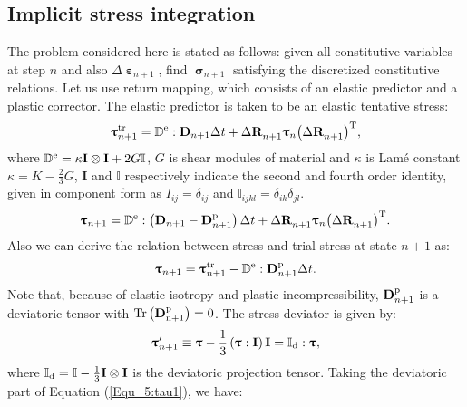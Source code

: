 \subsection{Implicit stress integration}
\noindent
The problem considered here is stated as follows: given all constitutive variables at step $n$ and also $\Delta {{\bm{\upepsilon }}_{n + 1}}$, find $\bm{\upsigma}_{n+1}$  satisfying the discretized constitutive relations. Let us use return mapping, which consists of an elastic predictor and a plastic corrector. The elastic predictor is taken to be an elastic tentative stress:
\begin{equation}
{\bm{\uptau }}_{n + 1}^{\rm tr} = {\mathbb{D}^{\rm{e}}}: {{\mathbf{D}}_{n + 1} \Delta t} + \Delta {\mathbf{R}}_{n + 1}^{}{{\bm{\uptau }}_n}{\left( {\Delta {\mathbf{R}}_{n + 1}^{}} \right)^{\rm{T}}},
\end{equation}
where ${\mathbb{D}^{\rm{e}}} = \kappa {\mathbf{I}} \otimes {\mathbf{I}} + 2G\mathbb{I}$, $G$ is shear modules of material and $\kappa$ is Lam\'{e} constant $\kappa  = K - \frac{2}{3}G$, ${\mathbf{I}}$ and $\mathbb{I}$ respectively indicate the second and fourth order identity, given in component form as ${I_{ij}} = {\delta _{ij}}$ and ${\mathbb{I}_{ijkl}} = {\delta _{ik}}{\delta _{jl}}$.
\begin{equation}
{\bm{\uptau }}_{n + 1} = {\mathbb{D}^{\rm{e}}}: \left( {\mathbf{D}}_{n + 1} -{\mathbf{D}}_{n + 1}^{\rm p} \right) \Delta t + \Delta {\mathbf{R}}_{n + 1}^{}{{\bm{\uptau }}_n}{\left( {\Delta {\mathbf{R}}_{n + 1}^{}} \right)^{\rm{T}}}.
\end{equation}
Also we can derive the relation between stress and trial stress at state $n+1$ as:
\begin{equation}
\label{Equ_5:tau1}
{\bm{\uptau }}_{n + 1} = {\bm{\uptau }}_{n + 1}^{\rm tr} - {\mathbb{D}^{\rm{e}}}: {\mathbf{D}}_{n + 1}^{\rm p} \Delta t.
\end{equation}
Note that, because of elastic isotropy and plastic incompressibility, ${\mathbf{D}}_{n + 1}^{\rm p}$ is a deviatoric tensor with $\rm{Tr}\left( {\mathbf{D}}_{n + 1}^{\rm p} \right)=0$.
The stress deviator is given by:
\begin{equation}
{\bm{\uptau }}'_{n + 1} \equiv {\bm{\uptau }} - \frac{1}{3}\left( {{\bm{\uptau }}:{\mathbf{I}}} \right){\mathbf{I}} = {\mathbb{I}_{\rm d}}:{\bm{\uptau }},
\end{equation}
where ${\mathbb{I}_{\rm d}} = \mathbb{I} - \frac{1}{3}{\mathbf{I}} \otimes {\mathbf{I}}$ is the deviatoric projection tensor.
Taking the deviatoric part of Equation (\ref{Equ_5:tau1}), we have:
